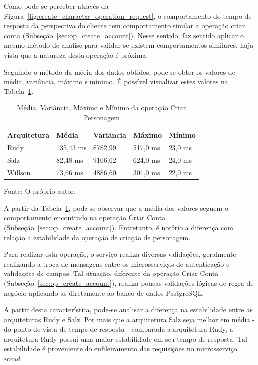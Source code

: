 Como pode-se perceber através da Figura~\ref{fig:create_character_operation_request}, o comportamento do tempo de resposta da perspectiva do cliente tem comportamento similar a operação criar conta (Subseção~\ref{sec:op_create_account}).
%
Nesse sentido, faz sentido aplicar o mesmo método de análise para validar se existem comportamentos similares, haja vista que a natureza desta operação é próxima.

Seguindo o método da média dos dados obtidos, pode-se obter os valores de média, variância, máximo e mínimo.
%
É possível visualizar estes valores na Tabela~\ref{tab:create_character_operation_request}.

\begin{table}[htb!]
\centering
\begin{adjustbox}{max width=\textwidth}
\caption{Média, Variância, Máximo e Mínimo da operação Criar Personagem}
\label{tab:create_character_operation_request}
\begin{tabular}{l|l|l|l|l}
\hline \hline
Arquitetura & Média     & Variância & Máximo    & Mínimo  \\ \hline \hline
Rudy        & 135,43 ms & 8782,99 & 517,0 ms & 23,0 ms \\ \hline
Salz        & 82,48 ms & 9106,62  & 624,0 ms & 24,0 ms \\ \hline
Willson     & 73,66 ms & 4886,60  & 301,0 ms  & 22,0 ms \\ \hline \hline
\end{tabular}

\end{adjustbox}

Fonte: O próprio autor.
\end{table}

A partir da Tabela~\ref{tab:create_character_operation_request}, pode-se observar que a média dos valores seguem o comportamento encontrado na operação Criar Conta (Subseção~\ref{sec:op_create_account}). 
%
Entretanto, é notório a diferença com relação a estabilidade da operação de criação de personagem.

Para realizar esta operação, o serviço realiza diversas validações, geralmente realizando a troca de mensagens entre os microsserviços de autenticação e validações de campos.
%
Tal situação, diferente da operação Criar Conta (Subseção~\ref{sec:op_create_account}), realiza poucas validações lógicas de regra de negócio aplicando-as diretamente ao banco de dados PostgreSQL.

A partir desta característica, pode-se analisar a diferença na estabilidade entre as arquiteturas Rudy e Salz.
%
Por mais que a arquitetura Salz seja melhor em média - do ponto de vista de tempo de resposta - comparada a arquitetura Rudy, a arquitetura Rudy possui uma maior estabilidade em seu tempo de resposta.
%
Tal estabilidade é proveniente do enfileiramento das requisições no microsserviço \textit{rcrud}.

